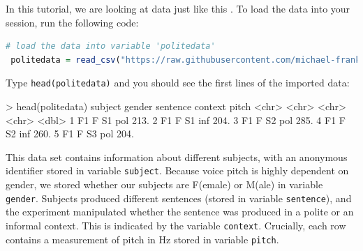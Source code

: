 \documentclass[nobib]{tufte-handout}
\newcommand{\ri}[1]{\lstinline{#1}}  %
\begin{document}
In this tutorial, we are looking at data just like this
\citep[following][]{Winter2013:Linear-models-a}. To load the data into your session,
run the following code:

\medskip


\begin{minipage}[]{\textwidth}
\begin{lstlisting}[language=R]
  # load the data into variable 'politedata'
 politedata = read_csv("https://raw.githubusercontent.com/michael-franke/bayes_mixed_regression_tutorial/master/code/politeness_data.csv")
\end{lstlisting}
\end{minipage}

\vspace*{-0.5cm}

\noindent Type \ri{head(politedata)} and you should see the first lines of the imported
data:

\medskip

\begin{minipage}[]{\textwidth}
\begin{rc}
> head(politedata)
   subject gender sentence context pitch
   <chr>   <chr>  <chr>    <chr>   <dbl>
 1 F1      F      S1       pol      213.
 2 F1      F      S1       inf      204.
 3 F1      F      S2       pol      285.
 4 F1      F      S2       inf      260.
 5 F1      F      S3       pol      204.
\end{rc}
\end{minipage}


\medskip

\noindent This data set contains information about different subjects, with an anonymous identifier stored in variable \texttt{subject}.
Because voice pitch is highly dependent on gender, we stored whether our subjects are F(emale) or M(ale) in variable \texttt{gender}.
Subjects produced different sentences (stored in variable \texttt{sentence}), and the experiment manipulated whether the sentence was produced in a polite or an informal context.
This is indicated by the variable \texttt{context}. Crucially, each row contains a measurement of pitch in Hz stored in variable \texttt{pitch}.
\end{document}
